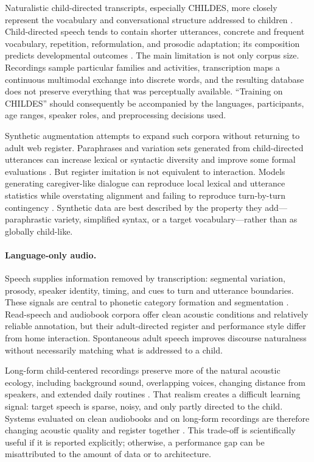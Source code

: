 Naturalistic child-directed transcripts, especially CHILDES, more closely represent the vocabulary and conversational structure addressed to children \citep{macwhinney_childes_2000}. Child-directed speech tends to contain shorter utterances, concrete and frequent vocabulary, repetition, reformulation, and prosodic adaptation; its composition predicts developmental outcomes \citep{WeislederFernald2013}. The main limitation is not only corpus size. Recordings sample particular families and activities, transcription maps a continuous multimodal exchange into discrete words, and the resulting database does not preserve everything that was perceptually available. ``Training on CHILDES'' should consequently be accompanied by the languages, participants, age ranges, speaker roles, and preprocessing decisions used.

Synthetic augmentation attempts to expand such corpora without returning to adult web register. Paraphrases and variation sets generated from child-directed utterances can increase lexical or syntactic diversity and improve some formal evaluations \citep{haga2024babylm}. But register imitation is not equivalent to interaction. Models generating caregiver-like dialogue can reproduce local lexical and utterance statistics while overstating alignment and failing to reproduce turn-by-turn contingency \citep{liu2024benchmarking}. Synthetic data are best described by the property they add---paraphrastic variety, simplified syntax, or a target vocabulary---rather than as globally child-like.

\paragraph{Language-only audio.}
Speech supplies information removed by transcription: segmental variation, prosody, speaker identity, timing, and cues to turn and utterance boundaries. These signals are central to phonetic category formation and segmentation \citep{Kuhl2006,saffran1996statistical}. Read-speech and audiobook corpora offer clean acoustic conditions and relatively reliable annotation, but their adult-directed register and performance style differ from home interaction. Spontaneous adult speech improves discourse naturalness without necessarily matching what is addressed to a child.

Long-form child-centered recordings preserve more of the natural acoustic ecology, including background sound, overlapping voices, changing distance from speakers, and extended daily routines \citep{cristia2020accuracy,bergelson2023everyday}. That realism creates a difficult learning signal: target speech is sparse, noisy, and only partly directed to the child. Systems evaluated on clean audiobooks and on long-form recordings are therefore changing acoustic quality and register together \citep{lavechin2024modeling}. This trade-off is scientifically useful if it is reported explicitly; otherwise, a performance gap can be misattributed to the amount of data or to architecture.

